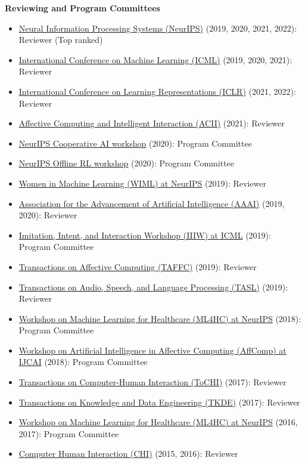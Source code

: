 \documentclass[paper=letter,fontsize=11pt]{scrartcl} %
\newcommand{\CommitteeEntry}[4]{
        \noindent \href{#4}{#1} (#2): #3}
\begin{document}
\noindent \textbf{Reviewing and Program Committees}
\begin{itemize}
    \item \CommitteeEntry{Neural Information Processing Systems (NeurIPS)}{2019, 2020, 2021, 2022}{Reviewer (Top ranked)}{}
    \item \CommitteeEntry{International Conference on Machine Learning (ICML)}{2019, 2020, 2021}{Reviewer}{}
    \item \CommitteeEntry{International Conference on Learning Representations (ICLR)}{2021, 2022}{Reviewer}{}
    \item \CommitteeEntry{Affective Computing and Intelligent Interaction (ACII)}{2021}{Reviewer}{}
    \item \CommitteeEntry{NeurIPS Cooperative AI workshop}{2020}{Program Committee}{}
    \item \CommitteeEntry{NeurIPS Offline RL workshop}{2020}{Program Committee}{}
    \item \CommitteeEntry{Women in Machine Learning (WIML) at NeurIPS}{2019}{Reviewer}{}
    \item \CommitteeEntry{Association for the Advancement of Artificial Intelligence (AAAI)}{2019, 2020}{Reviewer}{}
    \item \CommitteeEntry{Imitation, Intent, and Interaction Workshop (IIIW) at ICML}{2019}{Program Committee}{}
    \item \CommitteeEntry{Transactions on Affective Computing (TAFFC)}{2019}{Reviewer}{}
    \item \CommitteeEntry{Transactions on Audio, Speech, and Language Processing (TASL)}{2019}{Reviewer}{}
    \item \CommitteeEntry{Workshop on Machine Learning for Healthcare (ML4HC) at NeurIPS}{2018}{Program Committee}{}
    \item \CommitteeEntry{Workshop on Artificial Intelligence in Affective Computing (AffComp) at IJCAI}{2018}{Program Committee}{}
    \item \CommitteeEntry{Transactions on Computer-Human Interaction (ToCHI)}{2017}{Reviewer}{}
    \item \CommitteeEntry{Transactions on Knowledge and Data Engineering (TKDE)}{2017}{Reviewer}{}
    \item \CommitteeEntry{Workshop on Machine Learning for Healthcare (ML4HC) at NeurIPS}{2016, 2017}{Program Committee}{}
    \item \CommitteeEntry{Computer Human Interaction (CHI)}{2015, 2016}{Reviewer}{}

\end{itemize}
\end{document}
